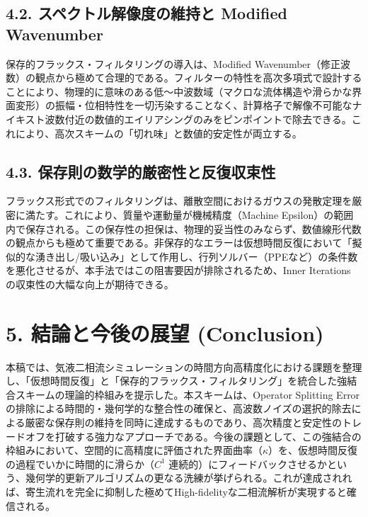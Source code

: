 \documentclass[12pt, a4paper, titlepage]{article}
\begin{document}
\subsection*{4.2. スペクトル解像度の維持と Modified Wavenumber}
保存的フラックス・フィルタリングの導入は、Modified Wavenumber（修正波数）の観点から極めて合理的である。フィルターの特性を高次多項式で設計することにより、物理的に意味のある低〜中波数域（マクロな流体構造や滑らかな界面変形）の振幅・位相特性を一切汚染することなく、計算格子で解像不可能なナイキスト波数付近の数値的エイリアシングのみをピンポイントで除去できる。これにより、高次スキームの「切れ味」と数値的安定性が両立する。

\subsection*{4.3. 保存則の数学的厳密性と反復収束性}
フラックス形式でのフィルタリングは、離散空間におけるガウスの発散定理を厳密に満たす。これにより、質量や運動量が機械精度（Machine Epsilon）の範囲内で保存される。この保存性の担保は、物理的妥当性のみならず、数値線形代数の観点からも極めて重要である。非保存的なエラーは仮想時間反復において「擬似的な湧き出し/吸い込み」として作用し、行列ソルバー（PPEなど）の条件数を悪化させるが、本手法ではこの阻害要因が排除されるため、Inner Iterations の収束性の大幅な向上が期待できる。

\section*{5. 結論と今後の展望 (Conclusion)}
本稿では、気液二相流シミュレーションの時間方向高精度化における課題を整理し、「仮想時間反復」と「保存的フラックス・フィルタリング」を統合した強結合スキームの理論的枠組みを提示した。本スキームは、Operator Splitting Errorの排除による時間的・幾何学的な整合性の確保と、高波数ノイズの選択的除去による厳密な保存則の維持を同時に達成するものであり、高次精度と安定性のトレードオフを打破する強力なアプローチである。今後の課題として、この強結合の枠組みにおいて、空間的に高精度に評価された界面曲率（$\kappa$）を、仮想時間反復の過程でいかに時間的に滑らか（$C^1$ 連続的）にフィードバックさせるかという、幾何学的更新アルゴリズムの更なる洗練が挙げられる。これが達成されれば、寄生流れを完全に抑制した極めてHigh-fidelityな二相流解析が実現すると確信される。
\end{document}
